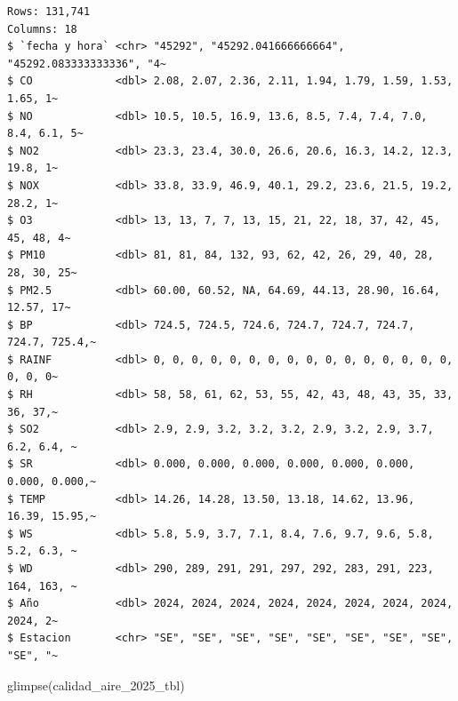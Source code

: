 \documentclass[
  letterpaper,
  DIV=11,
  numbers=noendperiod]{scrartcl}
\newenvironment{Shaded}{\begin{snugshade}}{\end{snugshade}}
\newcommand{\FunctionTok}[1]{\textcolor[rgb]{0.28,0.35,0.67}{#1}}
\newcommand{\NormalTok}[1]{\textcolor[rgb]{0.00,0.23,0.31}{#1}}
\begin{document}
\begin{verbatim}
Rows: 131,741
Columns: 18
$ `fecha y hora` <chr> "45292", "45292.041666666664", "45292.083333333336", "4~
$ CO             <dbl> 2.08, 2.07, 2.36, 2.11, 1.94, 1.79, 1.59, 1.53, 1.65, 1~
$ NO             <dbl> 10.5, 10.5, 16.9, 13.6, 8.5, 7.4, 7.4, 7.0, 8.4, 6.1, 5~
$ NO2            <dbl> 23.3, 23.4, 30.0, 26.6, 20.6, 16.3, 14.2, 12.3, 19.8, 1~
$ NOX            <dbl> 33.8, 33.9, 46.9, 40.1, 29.2, 23.6, 21.5, 19.2, 28.2, 1~
$ O3             <dbl> 13, 13, 7, 7, 13, 15, 21, 22, 18, 37, 42, 45, 45, 48, 4~
$ PM10           <dbl> 81, 81, 84, 132, 93, 62, 42, 26, 29, 40, 28, 28, 30, 25~
$ PM2.5          <dbl> 60.00, 60.52, NA, 64.69, 44.13, 28.90, 16.64, 12.57, 17~
$ BP             <dbl> 724.5, 724.5, 724.6, 724.7, 724.7, 724.7, 724.7, 725.4,~
$ RAINF          <dbl> 0, 0, 0, 0, 0, 0, 0, 0, 0, 0, 0, 0, 0, 0, 0, 0, 0, 0, 0~
$ RH             <dbl> 58, 58, 61, 62, 53, 55, 42, 43, 48, 43, 35, 33, 36, 37,~
$ SO2            <dbl> 2.9, 2.9, 3.2, 3.2, 3.2, 2.9, 3.2, 2.9, 3.7, 6.2, 6.4, ~
$ SR             <dbl> 0.000, 0.000, 0.000, 0.000, 0.000, 0.000, 0.000, 0.000,~
$ TEMP           <dbl> 14.26, 14.28, 13.50, 13.18, 14.62, 13.96, 16.39, 15.95,~
$ WS             <dbl> 5.8, 5.9, 3.7, 7.1, 8.4, 7.6, 9.7, 9.6, 5.8, 5.2, 6.3, ~
$ WD             <dbl> 290, 289, 291, 291, 297, 292, 283, 291, 223, 164, 163, ~
$ Año            <dbl> 2024, 2024, 2024, 2024, 2024, 2024, 2024, 2024, 2024, 2~
$ Estacion       <chr> "SE", "SE", "SE", "SE", "SE", "SE", "SE", "SE", "SE", "~
\end{verbatim}

\begin{Shaded}
\begin{Highlighting}[]
\FunctionTok{glimpse}\NormalTok{(calidad\_aire\_2025\_tbl)}
\end{Highlighting}
\end{Shaded}
\end{document}
